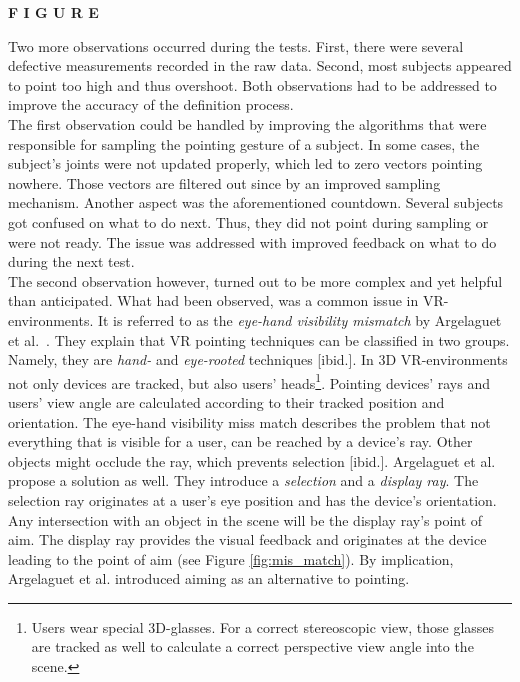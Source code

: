 \textbf{F I G U R E}

Two more observations occurred during the tests. First, there were several defective measurements recorded in the raw data. Second, most subjects appeared to point too high and thus overshoot. Both observations had to be addressed to improve the accuracy of the definition process.
\\
The first observation could be handled by improving the algorithms that were responsible for sampling the pointing gesture of a subject. In some cases, the subject's joints were not updated properly, which led to zero vectors pointing nowhere. Those vectors are filtered out since by an improved sampling mechanism. Another aspect was the aforementioned countdown. Several subjects got confused on what to do next. Thus, they did not point during sampling or were not ready. The issue was addressed with improved feedback on what to do during the next test.
\\
The second observation however, turned out to be more complex and yet helpful than anticipated. What had been observed, was a common issue in \ac{VR}-environments. It is referred to as the \textit{eye-hand visibility mismatch} by Argelaguet et al.~\cite{EyeHandMissmatchVR}. They explain that \ac{VR} pointing techniques can be classified in two groups. Namely, they are \textit{hand-} and \textit{eye-rooted} techniques [ibid.]. In \ac{3D} \ac{VR}-environments not only devices are tracked, but also users' heads\footnote{Users wear special \ac{3D}-glasses. For a correct stereoscopic view, those glasses are tracked as well to calculate a correct perspective view angle into the scene.}. Pointing devices' rays and users' view angle are calculated according to their tracked position and orientation. The eye-hand visibility miss match describes the problem that not everything that is visible for a user, can be reached by a device's ray. Other objects might occlude the ray, which prevents selection [ibid.]. Argelaguet et al. propose a solution as well. They introduce a \textit{selection} and a \textit{display ray}. The selection ray originates at a user's eye position and has the device's orientation. Any intersection with an object in the scene will be the display ray's point of aim. The display ray provides the visual feedback and originates at the device leading to the point of aim (see Figure \ref{fig:mis_match}). By implication, Argelaguet et al. introduced aiming as an alternative to pointing. 

